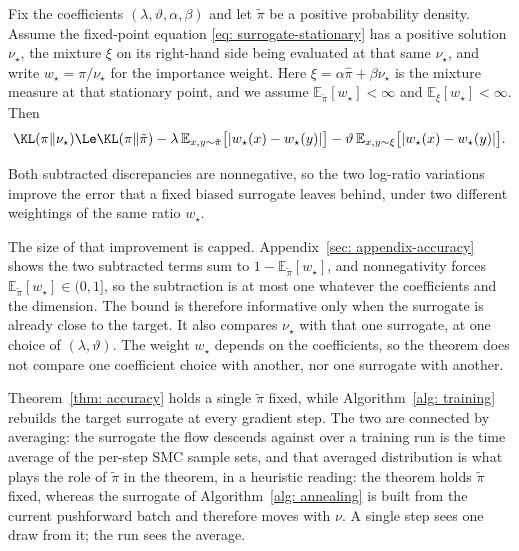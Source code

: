 \documentclass{article}
\begin{document}
\begin{theorem}
\label{thm: accuracy}
Fix the coefficients $(\lambda,\vartheta,\alpha,\beta)$ and let $\tilde\pi$ be a positive probability density. Assume the fixed-point equation \eqref{eq: surrogate-stationary} has a positive solution $\nu_\star$, the mixture $\xi$ on its right-hand side being evaluated at that same $\nu_\star$, and write $w_\star = \pi/\nu_\star$ for the importance weight. Here $\xi=\alpha\hat\pi+\beta\nu_\star$ is the mixture measure at that stationary point, and we assume $\mathbb E_{\tilde\pi}[w_\star]<\infty$ and $\mathbb E_{\xi}[w_\star]<\infty$. Then
\begin{equation}
	\KL(\pi\|\nu_\star) \Le \KL(\pi\|\tilde\pi)
	- \lambda\,\mathbb E_{x,y\sim\tilde\pi}\bigl[|w_\star(x)-w_\star(y)|\bigr]
	- \vartheta\,\mathbb E_{x,y\sim\xi}\bigl[|w_\star(x)-w_\star(y)|\bigr] .
	\label{eq: accuracy-bound}
\end{equation}
\end{theorem}
Both subtracted discrepancies are nonnegative, so the two log-ratio variations improve the error that a fixed biased surrogate leaves behind, under two different weightings of the same ratio $w_\star$.

The size of that improvement is capped. Appendix~\ref{sec: appendix-accuracy} shows the two subtracted terms sum to $1-\mathbb E_{\tilde\pi}[w_\star]$, and nonnegativity forces $\mathbb E_{\tilde\pi}[w_\star]\in(0,1]$, so the subtraction is at most one whatever the coefficients and the dimension. The bound is therefore informative only when the surrogate is already close to the target. It also compares $\nu_\star$ with that one surrogate, at one choice of $(\lambda,\vartheta)$. The weight $w_\star$ depends on the coefficients, so the theorem does not compare one coefficient choice with another, nor one surrogate with another.

Theorem~\ref{thm: accuracy} holds a single $\tilde\pi$ fixed, while Algorithm~\ref{alg: training} rebuilds the target surrogate at every gradient step. The two are connected by averaging: the surrogate the flow descends against over a training run is the time average of the per-step SMC sample sets, and that averaged distribution is what plays the role of $\tilde\pi$ in the theorem, in a heuristic reading: the theorem holds $\tilde\pi$ fixed, whereas the surrogate of Algorithm~\ref{alg: annealing} is built from the current pushforward batch and therefore moves with $\nu$. A single step sees one draw from it; the run sees the average.
\end{document}
